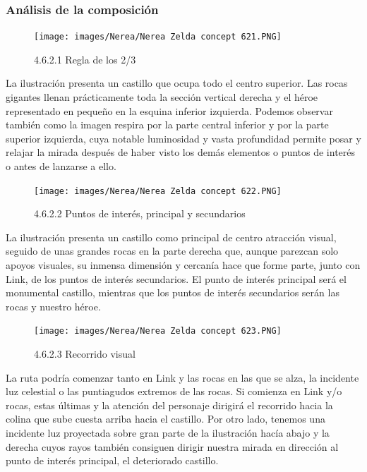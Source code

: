 \documentclass[12pt]{article}
\begin{document}
        \subsubsection{Análisis de la composición}

        
    \begin{figure}[H]
      \centering
      \texttt{[image: images/Nerea/Nerea Zelda concept 621.PNG]}
      \caption{\small 4.6.2.1 Regla de los 2/3}
    \end{figure}

    La ilustración presenta un castillo que ocupa todo el centro superior. Las rocas gigantes llenan prácticamente toda la sección vertical derecha y el héroe representado en pequeño en la esquina inferior izquierda. Podemos observar también como la imagen respira por la parte central inferior y por la parte superior izquierda, cuya notable luminosidad y vasta profundidad permite posar y relajar la mirada después de haber visto los demás elementos o puntos de interés o antes de lanzarse a ello.

    \begin{figure}[H]
      \centering
      \texttt{[image: images/Nerea/Nerea Zelda concept 622.PNG]}
      \caption{\small 4.6.2.2 Puntos de interés, principal y secundarios}
    \end{figure}

    La ilustración presenta un castillo como principal de centro atracción visual, seguido de unas grandes rocas en la parte derecha que, aunque parezcan solo apoyos visuales, su inmensa dimensión y cercanía hace que forme parte, junto con Link, de los puntos de interés secundarios. El punto de interés principal será el monumental castillo, mientras que los puntos de interés secundarios serán las rocas y nuestro héroe.

    \begin{figure}[H]
      \centering
      \texttt{[image: images/Nerea/Nerea Zelda concept 623.PNG]}
      \caption{\small 4.6.2.3 Recorrido visual}
    \end{figure}

    La ruta podría comenzar tanto en Link y las rocas en las que se alza, la incidente luz celestial o las puntiagudos extremos de las rocas. Si comienza en Link y/o rocas, estas últimas y la atención del personaje dirigirá el recorrido hacia la colina que sube cuesta arriba hacia el castillo. Por otro lado, tenemos una incidente luz proyectada sobre gran parte de la ilustración hacía abajo y la derecha cuyos rayos también consiguen dirigir nuestra mirada en dirección al punto de interés principal, el deteriorado castillo.
\end{document}
